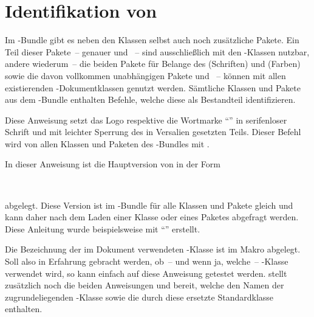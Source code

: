 \chapter{Identifikation von \TUDScript}
Im \TUDScript-Bundle gibt es neben den Klassen selbst auch noch zusätzliche 
Pakete. Ein Teil dieser Pakete~-- genauer  und 
~-- sind ausschließlich mit den \TUDScript-Klassen nutzbar, 
andere wiederum~-- die beiden Pakete für Belange des \CDs {} 
(Schriften) und  (Farben) sowie die davon vollkommen 
unabhängigen Pakete  und ~-- können mit 
allen existierenden -Dokumentklassen genutzt werden. Sämtliche 
Klassen und Pakete aus dem \TUDScript-Bundle enthalten Befehle, welche diese 
als Bestandteil identifizieren.

\begin{Declaration}[v2.04]{}
\printdeclarationlist%
%
Diese Anweisung setzt das Logo respektive die Wortmarke \enquote{\TUDScript{}} 
in serifenloser Schrift und mit leichter Sperrung des in Versalien gesetzten 
Teils. Dieser Befehl wird von allen Klassen und Paketen des \TUDScript-Bundles 
mit .
\end{Declaration}

\begin{Declaration}[v2.04]{}
\printdeclarationlist%
%
In dieser Anweisung ist die Hauptversion von \TUDScript in der Form
\begin{quoting}
~~
\end{quoting}
abgelegt. Diese Version ist im \TUDScript-Bundle für alle Klassen und Pakete 
gleich und kann daher nach dem Laden einer Klasse oder eines Paketes abgefragt 
werden. Diese Anleitung wurde beispielsweise mit \enquote{\TUDVersion{}} 
erstellt.
\end{Declaration}

\begin{Declaration}[v2.04]{}
\printdeclarationlist%
%
Die Bezeichnung der im Dokument verwendeten \TUDScript-Klasse ist im Makro 
 abgelegt. Soll also in Erfahrung gebracht werden, 
ob~-- und wenn ja, welche~-- \TUDScript-Klasse verwendet wird, so kann einfach 
auf diese Anweisung getestet werden. \KOMAScript{} stellt zusätzlich noch die 
beiden Anweisungen  und  bereit, welche 
den Namen der zugrundeliegenden \KOMAScript-Klasse sowie die durch diese 
ersetzte Standardklasse enthalten.
\end{Declaration}
